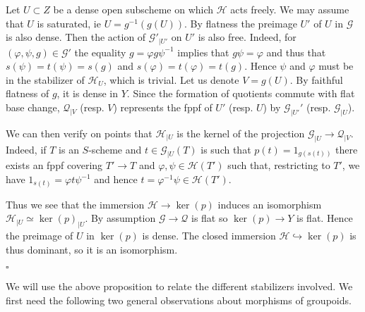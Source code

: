 \documentclass{amsart}
\newenvironment{demo}{{\flushleft \bf Proof~:}}{\hfill $\square$ \vspace{5mm}}
\theoremstyle{definition}
\theoremstyle{remark}
\begin{document}
\begin{demo}
Let $U \subset Z$ be a dense open subscheme on which ${{\mathcal H}}$ acts freely. We may assume that $U$ is saturated, ie $U = g^{-1}(g(U))$. By flatness the preimage $U'$ of $U$ in ${{\mathcal G}}$ is also dense. Then the action of ${{\mathcal G}}'_{\vert U'}$ on $U'$ is also free. Indeed, for $(\varphi,\psi,g) \in {{\mathcal G}}'$ the equality $g = \varphi g \psi^{-1}$ implies that $g \psi = \varphi$ and thus that $s(\psi) = t(\psi) = s(g)$ and $s(\varphi) = t(\varphi) = t(g)$. Hence $\psi$ and $\varphi$ must be in the stabilizer of ${{\mathcal H}}_{U}$, which is trivial. 
Let us denote $V = g(U)$. By faithful flatness of $g$, it is dense in $Y$. 
Since the formation of quotients commute with flat base change, ${{\mathcal Q}}_{\vert V}$ (resp. $V$) represents the fppf of $U'$ (resp. $U$) by ${{\mathcal G}}_{\vert U'}'$ (resp. ${{\mathcal G}}_{\vert U}$).  

We can then verify on points that ${{\mathcal H}}_{\vert U}$  is the kernel of the projection ${{\mathcal G}}_{\vert U } {\longrightarrow} {{\mathcal Q}}_{\vert V}$. Indeed, if $T$ is an $S$-scheme and $t \in {{\mathcal G}}_{\vert U} (T)$ is such that $p(t) = 1_{g(s(t))}$ there exists an fppf covering $T' {\longrightarrow} T$ and $\varphi,\psi \in {{\mathcal H}}(T')$ such that, restricting to $T'$, we have $1_{s(t)} = \varphi t \psi^{-1}$ and hence $t = \varphi^{-1} \psi \in {{\mathcal H}}(T')$.

Thus we see that the immersion ${{\mathcal H}} {\longrightarrow} \ker(p)$ induces an isomorphism ${{\mathcal H}}_{\vert U} \simeq \ker(p)_{\vert U}$. By assumption ${{\mathcal G}} {\longrightarrow} {{\mathcal Q}}$ is flat so $\ker(p) {\longrightarrow} Y$ is flat. Hence the preimage of $U$ in $\ker(p)$ is dense. The closed immersion ${{\mathcal H}} {\hookrightarrow} \ker(p)$ is thus dominant, so it is an isomorphism.  

\end{demo}

We will use the above proposition to relate the different stabilizers involved. We first need the following two general observations about morphisms of groupoids. 
\end{document}
